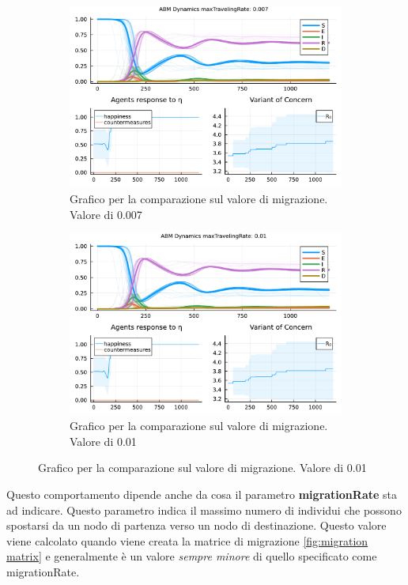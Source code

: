\begin{figure}[!hb]
\begin{subfigure}[b]{0.45\textwidth}
		\includegraphics[width=\textwidth]{img/SocialNetworkABM_3_MTR.pdf}
		\caption{Grafico per la comparazione sul valore di migrazione. Valore di 0.007}
		\label{fig:comparison_maxTravelingRate_midh}
	\end{subfigure}
	\hfill
	\begin{subfigure}[b]{0.45\textwidth}
		\centering
		\includegraphics[width=\textwidth]{img/SocialNetworkABM_4_MTR.pdf}
		\caption{Grafico per la comparazione sul valore di migrazione. Valore di 0.01}
		\label{fig:comparison_maxTravelingRate_high}
	\end{subfigure}
\end{figure}

Questo comportamento dipende anche da cosa il parametro \textbf{migrationRate} sta ad indicare. Questo parametro indica il massimo numero 
di individui che possono spostarsi da un nodo di partenza verso un nodo di destinazione. Questo valore viene calcolato quando viene 
creata la matrice di migrazione \ref{fig:migration matrix} e generalmente è un valore \emph{sempre minore} di quello specificato come migrationRate.
\newpage


